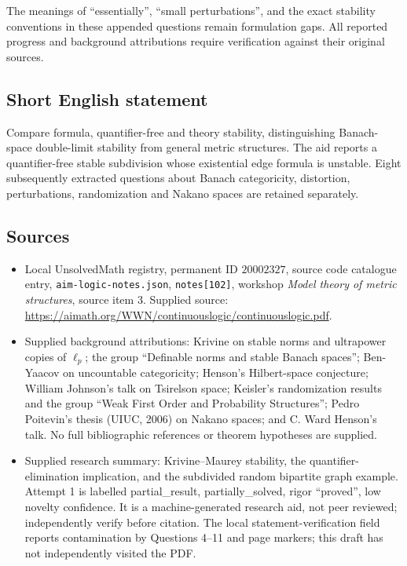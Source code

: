 \documentclass[11pt]{article}
\begin{document}
The meanings of ``essentially'', ``small perturbations'', and the exact stability conventions in these appended questions remain formulation gaps. All reported progress and background attributions require verification against their original sources.
\subsection{Short English statement}
Compare formula, quantifier-free and theory stability, distinguishing Banach-space double-limit stability from general metric structures. The aid reports a quantifier-free stable subdivision whose existential edge formula is unstable. Eight subsequently extracted questions about Banach categoricity, distortion, perturbations, randomization and Nakano spaces are retained separately.
\subsection{Sources}
\begin{itemize}
\item Local UnsolvedMath registry, permanent ID \(20002327\), source code catalogue entry, \texttt{aim-logic-notes.json}, \texttt{notes[102]}, workshop \emph{Model theory of metric structures}, source item 3. Supplied source: \url{https://aimath.org/WWN/continuouslogic/continuouslogic.pdf}.
\item Supplied background attributions: Krivine on stable norms and ultrapower copies of \(\ell_p\); the group ``Definable norms and stable Banach spaces''; Ben-Yaacov on uncountable categoricity; Henson's Hilbert-space conjecture; William Johnson's talk on Tsirelson space; Keisler's randomization results and the group ``Weak First Order and Probability Structures''; Pedro Poitevin's thesis (UIUC, 2006) on Nakano spaces; and C. Ward Henson's talk. No full bibliographic references or theorem hypotheses are supplied.
\item Supplied research summary: Krivine--Maurey stability, the quantifier-elimination implication, and the subdivided random bipartite graph example. Attempt 1 is labelled partial\_result, partially\_solved, rigor ``proved'', low novelty confidence. It is a machine-generated research aid, not peer reviewed; independently verify before citation. The local statement-verification field reports contamination by Questions 4--11 and page markers; this draft has not independently visited the PDF.
\end{itemize}
\end{document}
